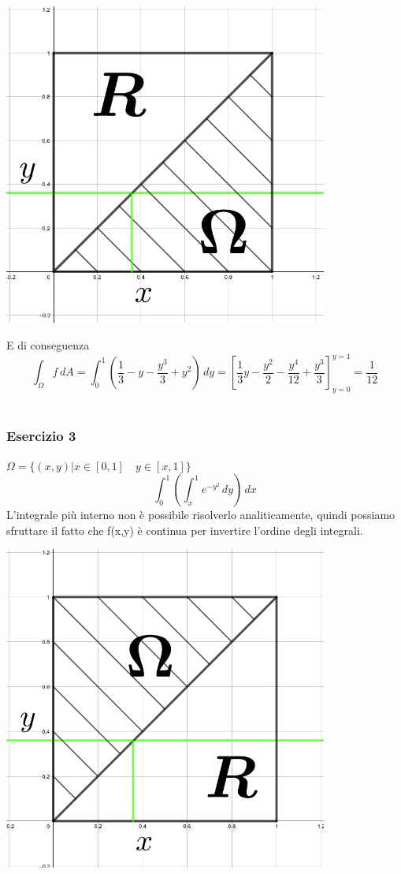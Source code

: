 \documentclass[10pt]{article}
\theoremstyle{plain}
\theoremstyle{definition}
\begin{document}
\begin{minipage}{.50\textwidth}
\centering
\includegraphics[width=0.8\textwidth]{fig2_libo.jpg}
\end{minipage}

E di conseguenza
$$\int_{\Omega} f\,dA = \int_0^1 \left( \frac{1}{3}-y-\frac{y^3}{3}+y^2\right)\,dy = \left[ \frac{1}{3}y - \frac{y^2}{2} -\frac{y^4}{12} + \frac{y^3}{3}\right]_{y=0}^{y=1} = \frac{1}{12}$$
\\
\subsubsection{Esercizio 3}
\begin{minipage}{.5\textwidth}
$\Omega = \{ (x,y) | x \in [0,1] \quad y \in [x,1] \}$
$$\int_0^1 \left( \int_x^1 e^{-y^2}\,dy\right)\,dx$$
L'integrale più interno non è possibile risolverlo analiticamente, quindi possiamo sfruttare il fatto che f(x,y) è continua per invertire l'ordine degli integrali.
\end{minipage}%
\begin{minipage}{.50\textwidth}
\centering
\includegraphics[width=0.8\textwidth]{fig3_libo.jpg}
\end{minipage}
\end{document}
